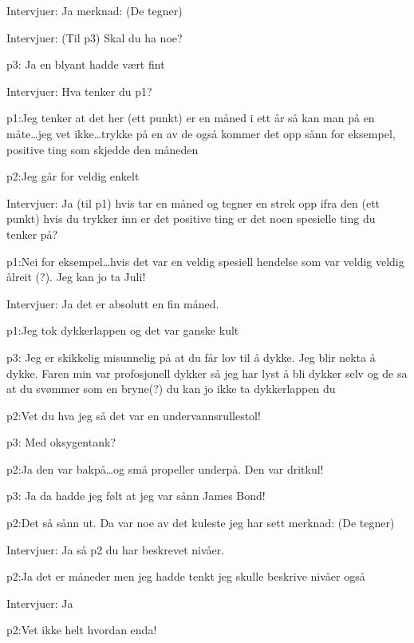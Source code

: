 \documentclass[11pt,UKenglish, a4paper]{article}
\begin{document}
\textcolor{myBlue} {Intervjuer:} Ja
merknad: (De tegner)

\textcolor{myBlue} {Intervjuer:} (Til p3) Skal du ha noe?

\textcolor{myR} {p3:} Ja en blyant hadde vært fint

\textcolor{myBlue} {Intervjuer:} Hva tenker du p1?

\textcolor{myGreen} {p1:}Jeg tenker at det her (ett punkt) er en måned i ett år så kan man på en måte\dots jeg vet ikke\dots trykke på en av de også kommer det opp sånn for eksempel, positive ting som skjedde den måneden

\textcolor{myYellow} {p2:}Jeg går for veldig enkelt

\textcolor{myBlue} {Intervjuer:} Ja (til p1) hvis tar en måned og tegner en strek opp ifra den (ett punkt) hvis du trykker inn er det positive ting er det noen spesielle ting du tenker på?

\textcolor{myGreen} {p1:}Nei for eksempel\dots hvis det var en veldig spesiell hendelse som var veldig veldig ålreit (?). Jeg kan jo ta Juli!

\textcolor{myBlue} {Intervjuer:} Ja det er absolutt en fin måned.

\textcolor{myGreen} {p1:}Jeg tok dykkerlappen og det var ganske kult

\textcolor{myR} {p3:} Jeg er skikkelig misunnelig på at du får lov til å dykke. Jeg blir nekta å dykke. Faren min var profosjonell dykker så jeg har lyst å bli dykker selv og de sa at du svømmer som en bryne(?) du kan jo ikke ta dykkerlappen du

\textcolor{myYellow} {p2:}Vet du hva jeg så det var en undervannsrullestol! 

\textcolor{myR} {p3:} Med oksygentank?

\textcolor{myYellow} {p2:}Ja den var bakpå\dots og små propeller underpå. Den var dritkul!

\textcolor{myR} {p3:} Ja da hadde jeg følt at jeg var sånn James Bond!

\textcolor{myYellow} {p2:}Det så sånn ut. Da var noe av det kuleste jeg har sett
merknad: (De tegner)

\textcolor{myBlue} {Intervjuer:} Ja så p2 du har beskrevet nivåer.

\textcolor{myYellow} {p2:}Ja det er måneder men jeg hadde tenkt jeg skulle beskrive nivåer også

\textcolor{myBlue} {Intervjuer:} Ja

\textcolor{myYellow} {p2:}Vet ikke helt hvordan enda!
\end{document}
